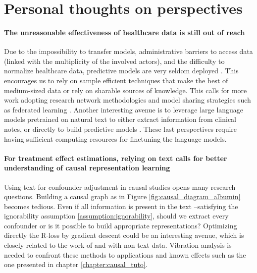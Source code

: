 \documentclass[french,12pt,twoside,a4paper]{book}
\begin{document}
\section{Personal thoughts on perspectives}

\paragraph{The unreasonable effectiveness of healthcare data is still out of
  reach} Due to the impossibility to transfer models, administrative barriers to
access data (linked with the multiplicity of the involved actors), and the
difficulty to normalize healthcare data, predictive models are very seldom
deployed \citep{kelly2019key}. This encourages us to rely on sample efficient
techniques that make the best of medium-sized data or rely on sharable sources
of knowledge. This calls for more work adopting research network methodologies
\citep{hripcsak2015observational} and model sharing strategies such as
federated learning \citep{rieke2020future}. Another interesting avenue is to
leverage large language models pretrained on natural text to either extract
information from clinical notes, or directly to build predictive models
\citep{jiang2023health}. These last perspectives require having sufficient
computing resources for finetuning the language models.

\paragraph{For treatment effect estimations, relying on text calls for better
  understanding of causal representation learning}

Using text for confounder adjustment in causal studies opens many research
questions. Building a causal graph as in Figure \ref{fig:causal_diagram_albumin}
becomes tedious. Even if all information is present in the text --satisfying the
ignorability assumption \ref{assumption:ignorability}, should we extract every
confounder or is it possible to build appropriate representations? Optimizing
directly the R-loss by gradient descent could be an interesting avenue, which is
closely related to the work of \cite{johansson2022generalization} and
\cite{chernozhukov2022riesznet} with non-text data. Vibration analysis is needed
to confront these methods to applications and known effects such as the one
presented in chapter \ref{chapter:causal_tuto}.
\end{document}
